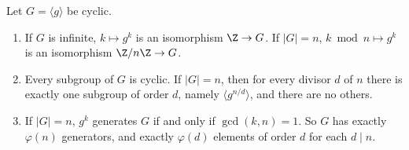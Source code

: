 \begin{theorem}\label{thm:cyclic}
Let $G=\langle g\rangle$ be cyclic.
\begin{enumerate}[label=(\alph*)]
\item If $G$ is infinite, $k\mapsto g^k$ is an isomorphism $\Z\to G$. If $|G|=n$, $k\bmod n\mapsto g^k$ is an isomorphism $\Z/n\Z\to G$.
\item Every subgroup of $G$ is cyclic. If $|G|=n$, then for every divisor $d$ of $n$ there is exactly one subgroup of order $d$, namely $\langle g^{n/d}\rangle$, and there are no others.
\item If $|G|=n$, $g^k$ generates $G$ if and only if $\gcd(k,n)=1$. So $G$ has exactly $\varphi(n)$ generators, and exactly $\varphi(d)$ elements of order $d$ for each $d\mid n$.
\end{enumerate}
\end{theorem}
